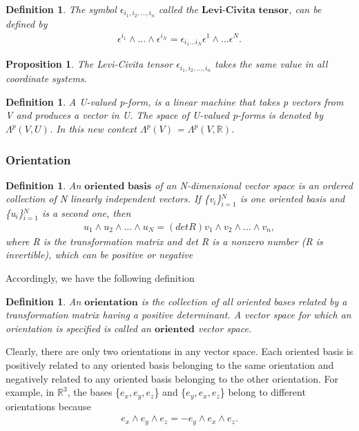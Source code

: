 \documentclass[12pt,a4paper]{article}
\newtheorem{defn}[thm]{Definition}
\newtheorem{prop}{Proposition}
\begin{document}
\begin{defn}
The symbol $\epsilon_{i_1, i_2, ... , i_n}$ called the $\textbf{Levi-Civita tensor}$, can be defined by
\begin{eqnarray*}
\epsilon^{i_1} \wedge ... \wedge \epsilon^{i_N} = \epsilon_{i_1 ... i_N} \epsilon^1 \wedge ... \epsilon^N.
\end{eqnarray*}
\end{defn}
\begin{prop}
The Levi-Civita tensor $\epsilon_{i_1, i_2, ... , i_n}$ takes the same value in
all coordinate systems.
\end{prop}
\begin{defn}
A U-valued p-form, is a linear machine that takes p
vectors from V and produces a vector in U. The space of U-valued p-forms
is denoted by $\Lambda^{p}(V, U)$.  In this new context $\Lambda^{p}(V)$ =  $\Lambda^{p}(V, \mathbb{R})$.
\end{defn}

\subsubsection{Orientation}
\begin{defn}
An $\textbf{oriented basis}$ of an N-dimensional vector space is
an ordered collection of N linearly independent vectors.
If \{v$_i$\}$^N_{i=1}$ is one oriented basis and \{u$_i$\}$^N_{i=1}$ is a second one, then\\
\begin{eqnarray*}
u_1 \wedge u_2 \wedge ... \wedge u_N = (det R)v_1 \wedge v_2 \wedge ... \wedge v_n,
\end{eqnarray*}
where R is the transformation matrix and det R is a nonzero number (R is
invertible), which can be positive or negative
\end{defn}
 \indent Accordingly, we have the following definition
\begin{defn}
An $\textbf{orientation}$ is the collection of all oriented bases related by a transformation matrix having a positive determinant. A vector
space for which an orientation is specified is called an $\textbf{oriented}$ vector space.
\end{defn}
\indent Clearly, there are only two orientations in any vector space. Each oriented
basis is positively related to any oriented basis belonging to the same orientation and negatively related to any oriented basis belonging to the other
orientation. For example, in $\mathbb{R}^3$,  the bases \{$e_x, e_y, e_z$\} and \{$e_y, e_x, e_z$\} belong
to different orientations because
\begin{eqnarray*}
e_x \wedge e_y \wedge e_z = -e_y \wedge e_x \wedge e_z.
\end{eqnarray*}
\end{document}
